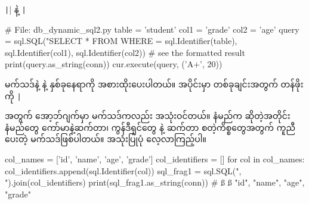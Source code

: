 

\texttt|{}| နဲ့ \texttt|%
%
\begin{py}
# File: db_dynamic_sql2.py 
table = 'student'
col1 = 'grade'
col2 = 'age'
query = sql.SQL("SELECT * FROM {} WHERE {} = %
    sql.Identifier(table), sql.Identifier(col1), sql.Identifier(col2))
# see the formatted result
print(query.as_string(conn))
cur.execute(query, ('A+', 20))
\end{py}
%
 မက်သဒ်နဲ့  နဲ့  နှစ်ခုနေရာကို \fEn{,} \fEn{,}  အစားထိုးပေးပါတယ်။  အပိုင်းမှာ  တစ်ခုချင်းအတွက် တန်ဖိုးကို \texttt|%

 အတွက်  အော့ဘ်ဂျက်မှာ  မက်သဒ်ကလည်း အသုံးဝင်တယ်။ နံမည်က  ဆိုတဲ့အတိုင်း  နံမည်တွေ ကော်မာနဲ့ဆက်တာ၊ ကွန်ဒီရှင်တွေ \fEn{/} နဲ့ ဆက်တာ စတဲ့ကိစ္စတွေအတွက် ကူညီပေးတဲ့ မက်သဒ်ဖြစ်ပါတယ်။ အသုံးပြုပုံ လေ့လာကြည့်ပါ။
%
\begin{py}
col_names = ['id', 'name', 'age', 'grade']
col_identifiers = []
for col in col_names:
    col_identifiers.append(sql.Identifier(col))
sql_frag1 = sql.SQL(", ").join(col_identifiers)
print(sql_frag1.as_string(conn)) # ß ß "id", "name", "age", "grade"
\end{py}
%

